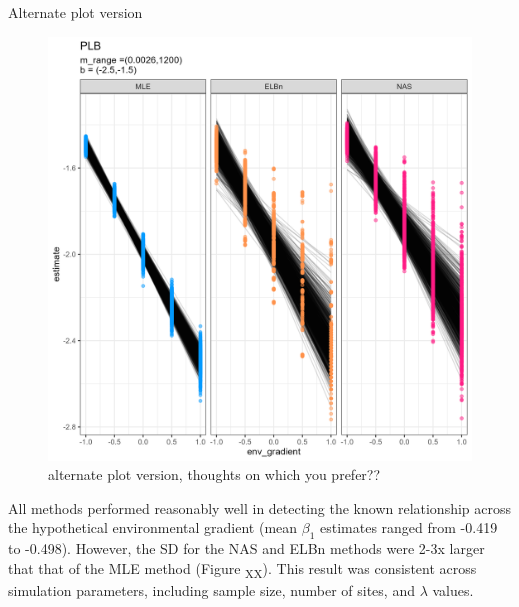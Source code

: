 \documentclass[
]{article}
\begin{document}
Alternate plot version

\begin{figure}
\centering
\includegraphics{figures/PLB_main_v2.png}
\caption{alternate plot version, thoughts on which you prefer??}
\end{figure}

All methods performed reasonably well in detecting the known
relationship across the hypothetical environmental gradient (mean
\(\beta_1\) estimates ranged from -0.419 to -0.498). However, the SD for
the NAS and ELBn methods were 2-3x larger that that of the MLE method
(Figure \textsubscript{XX}). This result was consistent across
simulation parameters, including sample size, number of sites, and
\(\lambda\) values.

\newpage
\end{document}
